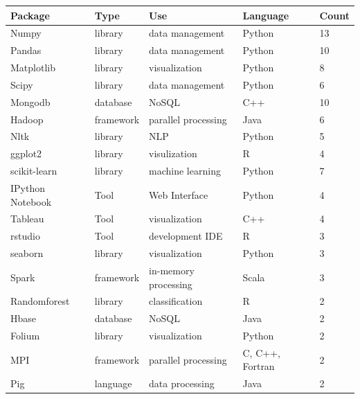\documentclass[9pt,twocolumn,twoside]{styles/osajnl}
\begin{document}
\begin{table}[htb]
  \begin{center}
    \begin{small}
      \begin{threeparttable}
        \begin{tabular}{l|l|l|l|l}

    Package          & Type      & Use                  & Language        & Count\tnote{*} \\ \hline \hline
    Numpy            & library   & data management      & Python          & 13             \\ \hline
    Pandas           & library   & data management      & Python          & 10             \\ \hline
    Matplotlib       & library   & visualization        & Python          & 8              \\ \hline
    Scipy            & library   & data management      & Python          & 6              \\ \hline
    Mongodb          & database  & NoSQL                & C++             & 10             \\ \hline
    Hadoop           & framework & parallel processing  & Java            & 6              \\ \hline
    Nltk             & library   & NLP                  & Python          & 5              \\ \hline
    ggplot2          & library   & visulization         & R               & 4              \\ \hline
    scikit-learn     & library   & machine learning     & Python          & 7              \\ \hline
    IPython Notebook & Tool      & Web Interface        & Python          & 4              \\ \hline
    Tableau          & Tool      & visualization        & C++             & 4              \\ \hline
    rstudio          & Tool      & development IDE      & R               & 3              \\ \hline
    seaborn          & library   & visualization        & Python          & 3              \\ \hline
    Spark            & framework & in-memory processing & Scala           & 3              \\ \hline
    Randomforest     & library   & classification       & R               & 2              \\ \hline
    Hbase            & database  & NoSQL                & Java            & 2              \\ \hline
    Folium           & library   & visualization        & Python          & 2              \\ \hline
    MPI              & framework & parallel processing  & C, C++, Fortran & 2              \\ \hline
    Pig              & language  & data processing      & Java            & 2              \\ 


\end{tabular}
\end{threeparttable}
\end{small}
\end{center}
\end{table}
\end{document}
